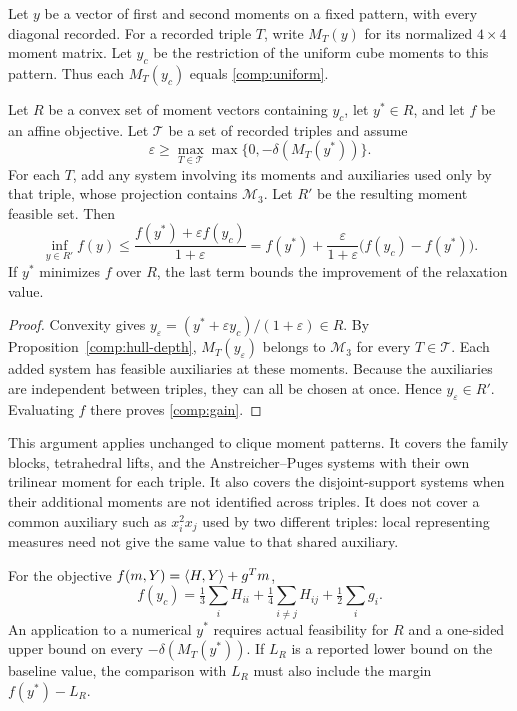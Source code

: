 Let $y$ be a vector of first and second moments on a fixed pattern, with
every diagonal recorded. For a recorded triple $T$, write $M_T(y)$ for
its normalized $4\times4$ moment matrix. Let $y_c$ be the restriction of
the uniform cube moments to this pattern. Thus each $M_T(y_c)$ equals
\eqref{comp:uniform}.

\begin{proposition}\label{comp:gain-bound}
Let $R$ be a convex set of moment vectors containing $y_c$, let $y^*\in R$,
and let $f$ be an affine objective. Let $\mathcal T$ be a set of recorded
triples and assume
\[
 \varepsilon\geq\max_{T\in\mathcal T}
                      \max\{0,-\delta(M_T(y^*))\}.
\]
For each $T$, add any system involving its moments and auxiliaries used
only by that triple, whose projection contains
$\mathcal M_3$. Let $R'$ be the resulting moment feasible set.
Then
\begin{equation}\label{comp:gain}
 \inf_{y\in R'}f(y)
 \leq \frac{f(y^*)+\varepsilon f(y_c)}{1+\varepsilon}
 =f(y^*)+\frac{\varepsilon}{1+\varepsilon}
                         \bigl(f(y_c)-f(y^*)\bigr).
\end{equation}
If $y^*$ minimizes $f$ over $R$, the last term bounds the improvement
of the relaxation value.
\end{proposition}

\begin{proof}
Convexity gives $y_\varepsilon=(y^*+\varepsilon y_c)/(1+\varepsilon)\in R$.
By Proposition~\ref{comp:hull-depth}, $M_T(y_\varepsilon)$ belongs to
$\mathcal M_3$ for every $T\in\mathcal T$. Each added system
has feasible auxiliaries at these moments. Because the auxiliaries are
independent between triples, they can all be chosen at once. Hence
$y_\varepsilon\in R'$. Evaluating $f$ there proves \eqref{comp:gain}.
\end{proof}

This argument applies unchanged to clique moment patterns. It covers the
family blocks, tetrahedral lifts, and the Anstreicher--Puges systems with
their own trilinear moment for each triple. It also covers the disjoint-support
systems when their additional moments are not identified across triples.
It does not cover a common auxiliary such as $x_i^2x_j$ used by two
different triples: local representing measures need not give the same
value to that shared auxiliary.

For the objective $f(m,Y)=\left\langle H,Y\right\rangle+g^Tm$,
\[
 f(y_c)=\tfrac13\sum_iH_{ii}
        +\tfrac14\sum_{i\ne j}H_{ij}+\tfrac12\sum_i g_i.
\]
An application to a numerical $y^*$ requires actual feasibility for $R$
and a one-sided upper bound on every $-\delta(M_T(y^*))$.
If $L_R$ is a reported lower bound on the baseline value, the comparison
with $L_R$ must also include the margin $f(y^*)-L_R$.

